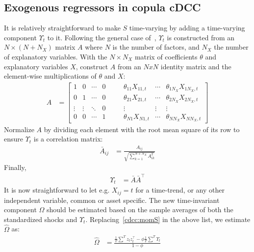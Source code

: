 \subsection{Exogenous regressors in copula cDCC}
It is relatively straightforward to make $S$ time-varying by adding a time-varying component $\Upsilon_t$ to it. Following the general case of~\autocite{ChristoffersenErrunzaJacobLanglois2012}, $\Upsilon_t$ is constructed from an $N\times(N + N_X)$ matrix $A$ where $N$ is the number of factors, and $N_X$ the number of explanatory variables. With the $N \times N_X$ matrix of coefficients $\theta$ and explanatory variables $X$, construct $A$ from an $NxN$ identity matrix and the element-wise multiplications of $\theta$ and $X$:
\begin{align}
  A &=
    \begin{bmatrix}
    1 & 0 & \cdots & 0            & \quad & \theta_{11} X_{11,t} & \cdots & \theta_{1N_X} X_{1N_X,t} \\
    0 & 1 & \cdots & 0            & \quad & \theta_{21} X_{21,t} & \cdots & \theta_{2N_X} X_{2N_X,t} \\
    \vdots & \vdots & \ddots & 0  & \quad & \vdots &               \vdots & \vdots \\
    0 & 0 & \cdots & 1            & \quad & \theta_{N1} X_{N1,t} & \cdots & \theta_{NN_X} X_{NN_X,t}
    \end{bmatrix}
\end{align}
Normalize $A$ by dividing each element with the root mean square of its row to ensure $\Upsilon_t$ is a correlation matrix:
\begin{align}
  \bar{A}_{ij} &= \frac{A_{ij}}{\sqrt{\sum_{k = 1}^{N + N_X} A_{ik}^2}}
\end{align}
Finally,
\begin{align}
  \Upsilon_t &= \bar{A} \bar{A}^\top
\end{align}
It is now straightforward to let e.g. $X_{ij} = t$ for a time-trend, or any other independent variable, common or asset specific. The new time-invariant component $\Omega$ should be estimated based on the sample averages of both the standardized shocks and $\Upsilon_t$. Replacing~\autoref{cdcc:momS} in the above list, we estimate $\hat{\Omega}$ as:
\begin{align}
  \hat{\Omega} &=
    \frac{
      \frac{1}{T} \sum^{T} z_t z_t^\top -
      \phi
      \frac{1}{T} \sum^{T} \Upsilon_t
    }{1 - \phi}
\end{align}

\newpage


